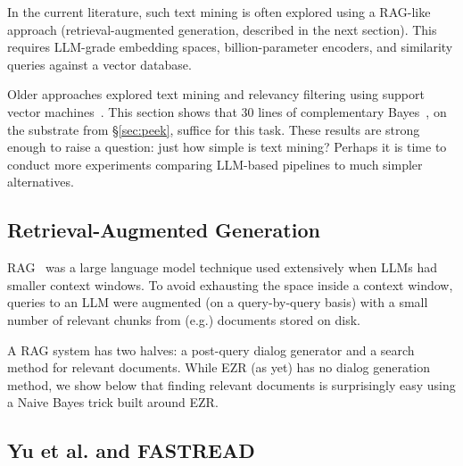 \documentclass[AMA,STIX2COL]{WileyNJDv5}
\begin{document}
 In the current literature,  such text mining is often
 explored using a RAG-like approach (retrieval-augmented
 generation, described in the next section). 
This requires LLM-grade embedding spaces, billion-parameter encoders,
and similarity queries against a vector database. 

Older
approaches explored text mining and relevancy filtering using
support vector machines~\cite{yu2018total,yu2018finding}. This section shows
that 30 lines of complementary Bayes~\cite{rennie2003tackling},
on the substrate from \S\ref{sec:peek}, suffice for this task.
These results are strong enough to raise a question: just
how simple is text mining? Perhaps it is time to conduct more
experiments comparing LLM-based pipelines to much simpler
alternatives.



 \subsection{Retrieval-Augmented Generation} 
 RAG~\cite{lewis2020rag} was a large language model
 technique used extensively when LLMs
 had smaller context
 windows. To avoid exhausting the space
 inside a context window,
   queries to an LLM were 
augmented (on a query-by-query basis)
with a small number of relevant chunks
from (e.g.)  documents stored on disk. 

A RAG system has two halves: a post-query dialog generator and a
 search method for relevant documents. While EZR (as yet)
has no dialog generation method, we show below
that finding relevant documents is surprisingly easy using
a Naive Bayes trick built
around EZR.

\subsection{Yu et al. and FASTREAD}
\end{document}

